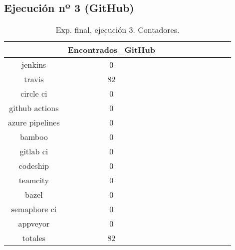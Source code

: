 \begin{table}[h]
\begin{footnotesize}
\begin{tabular}{ccccccccccc}
 \end{tabular}
\end{footnotesize}

\end{table}

\subsection{Ejecución nº 3 (GitHub)}
\begin{table}[h]
  \centering
  \caption{Exp. final, ejecución 3. Contadores.}
  \label{tab:tabla_f3_1}

\begin{footnotesize}
\renewcommand{\arraystretch}{1.5} %
\begin{tabular}{ccccccccccc}
  \hline
  {} &  Encontrados\_GitHub \\
  \hline
  jenkins         &                   0 \\
  travis          &                  82 \\
  circle ci       &                   0 \\
  github actions  &                   0 \\
  azure pipelines &                   0 \\
  bamboo          &                   0 \\
  gitlab ci       &                   0 \\
  codeship        &                   0 \\
  teamcity        &                   0 \\
  bazel           &                   0 \\
  semaphore ci    &                   0 \\
  appveyor        &                   0 \\
  totales         &                  82 \\
 \end{tabular}
\end{footnotesize}

\end{table}

